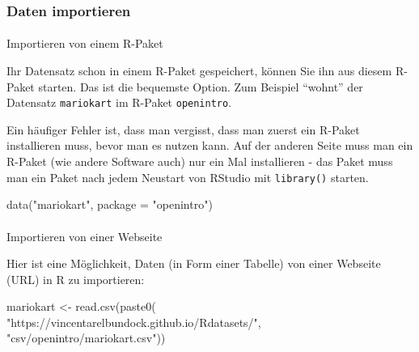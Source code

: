 \documentclass[
  letterpaper,
  DIV=11,
  numbers=noendperiod]{scrartcl}
\makeatletter
\let\oldparagraph\paragraph
\renewcommand{\paragraph}{
    \@ifstar
      \xxxParagraphStar
      \xxxParagraphNoStar
  }
\newcommand{\xxxParagraphStar}[1]{\oldparagraph*{#1}\mbox{}}
\newcommand{\xxxParagraphNoStar}[1]{\oldparagraph{#1}\mbox{}}
\newenvironment{Shaded}{\begin{snugshade}}{\end{snugshade}}
\newcommand{\AttributeTok}[1]{\textcolor[rgb]{0.40,0.45,0.13}{#1}}
\newcommand{\FunctionTok}[1]{\textcolor[rgb]{0.28,0.35,0.67}{#1}}
\newcommand{\NormalTok}[1]{\textcolor[rgb]{0.00,0.23,0.31}{#1}}
\newcommand{\OtherTok}[1]{\textcolor[rgb]{0.00,0.23,0.31}{#1}}
\newcommand{\StringTok}[1]{\textcolor[rgb]{0.13,0.47,0.30}{#1}}
\theoremstyle{definition}
\theoremstyle{definition}
\theoremstyle{definition}
\theoremstyle{remark}
\makeatother
\begin{document}
\subsubsection{Daten importieren}\label{daten-importieren}

\paragraph{Importieren von einem
R-Paket}\label{importieren-von-einem-r-paket}

Ihr Datensatz schon in einem R-Paket gespeichert, können Sie ihn aus
diesem R-Paket starten. Das ist die bequemste Option. Zum Beispiel
``wohnt'' der Datensatz \texttt{mariokart} im R-Paket
\texttt{openintro}.

\begin{tcolorbox}[enhanced jigsaw, coltitle=black, colframe=quarto-callout-tip-color-frame, opacityback=0, toprule=.15mm, opacitybacktitle=0.6, arc=.35mm, titlerule=0mm, toptitle=1mm, title=\textcolor{quarto-callout-tip-color}{\faLightbulb}\hspace{0.5em}{Tip}, bottomtitle=1mm, leftrule=.75mm, breakable, rightrule=.15mm, colbacktitle=quarto-callout-tip-color!10!white, bottomrule=.15mm, colback=white, left=2mm]

Ein häufiger Fehler ist, dass man vergisst, dass man zuerst ein R-Paket
installieren muss, bevor man es nutzen kann. Auf der anderen Seite muss
man ein R-Paket (wie andere Software auch) nur ein Mal installieren -
das Paket muss man ein Paket nach jedem Neustart von RStudio mit
\texttt{library()} starten.

\end{tcolorbox}

\begin{Shaded}
\begin{Highlighting}[]
\FunctionTok{data}\NormalTok{(}\StringTok{"mariokart"}\NormalTok{, }\AttributeTok{package =} \StringTok{"openintro"}\NormalTok{)}
\end{Highlighting}
\end{Shaded}

\paragraph{Importieren von einer
Webseite}\label{importieren-von-einer-webseite}

Hier ist eine Möglichkeit, Daten (in Form einer Tabelle) von einer
Webseite (URL) in R zu importieren:

\begin{Shaded}
\begin{Highlighting}[]
\NormalTok{mariokart }\OtherTok{\textless{}{-}} \FunctionTok{read.csv}\NormalTok{(}\FunctionTok{paste0}\NormalTok{(}
  \StringTok{"https://vincentarelbundock.github.io/Rdatasets/"}\NormalTok{,}
  \StringTok{"csv/openintro/mariokart.csv"}\NormalTok{))}
\end{Highlighting}
\end{Shaded}
\end{document}
